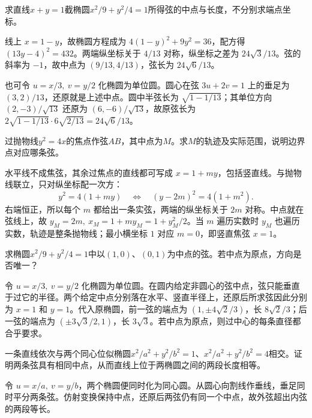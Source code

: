 求直线\(x+y=1\)截椭圆\(x^2/9+y^2/4=1\)所得弦的中点与长度，不分别求端点坐标。
\par
\solutionanswer
线上 \(x=1-y\)，故椭圆方程成为 \(4(1-y)^2+9y^2=36\)，配方得 \((13y-4)^2=432\)。两端纵坐标关于 \(4/13\) 对称，纵坐标之差为 \(24\sqrt3/13\)。弦的斜率为 \(-1\)，故中点为 \((9/13,4/13)\)，弦长为 \(24\sqrt6/13\)。

也可令 \(u=x/3,\ v=y/2\) 化椭圆为单位圆。圆心在弦 \(3u+2v=1\) 上的垂足为 \((3,2)/13\)，还原就是上述中点。圆中半弦长为 \(\sqrt{1-1/13}\)；其单位方向 \((2,-3)/\sqrt{13}\) 还原为 \((6,-6)/\sqrt{13}\)，故原弦长为 \(2\sqrt{1-1/13}\cdot6\sqrt{2/13}=24\sqrt6/13\)。




过抛物线\(y^2=4x\)的焦点作弦\(AB\)，其中点为\(M\)。求\(M\)的轨迹及实际范围，说明边界点对应哪条弦。
\par
\solutionanswer
水平线不成焦弦，其余过焦点的直线都可写成 \(x=1+my\)，包括竖直线。与抛物线联立，只对纵坐标配一次方：
\[
    y^2=4(1+my)\quad\Longleftrightarrow\quad (y-2m)^2=4(1+m^2).
\]
右端恒正，所以每个 \(m\) 都给出一条实弦，两端的纵坐标关于 \(2m\) 对称。中点就在弦线上，故 \(y_M=2m,\ x_M=1+my_M=1+y_M^2/2\)。当 \(m\) 遍历实数时 \(y_M\) 也遍历实数，轨迹是整条抛物线；最小横坐标 \(1\) 对应 \(m=0\)，即竖直焦弦 \(x=1\)。


求椭圆\(x^2/9+y^2/4=1\)中以\((1,0)\)、\((0,1)\)为中点的弦。若中点为原点，方向是否唯一？
\par
\solutionanswer
令 \(u=x/3,\ v=y/2\) 化椭圆为单位圆。在圆内给定非圆心的弦中点，弦只能垂直于过它的半径。两个给定中点分别落在水平、竖直半径上，还原后所求弦因此分别为 \(x=1\) 和 \(y=1\)。代入原椭圆，前一弦的端点为 \((1,\pm4\sqrt2/3)\)，长 \(8\sqrt2/3\)；后一弦的端点为 \((\pm3\sqrt3/2,1)\)，长 \(3\sqrt3\)。若中点为原点，则过中心的每条直径都合乎要求。




一条直线依次与两个同心位似椭圆\(x^2/a^2+y^2/b^2=1\)、\(x^2/a^2+y^2/b^2=4\)相交。证明两条弦具有相同中点，从而直线上位于两椭圆之间的两段长度相等。
\par
\solutionanswer
令 \(u=x/a,\ v=y/b\)，两个椭圆便同时化为同心圆。从圆心向割线作垂线，垂足同时平分两条弦。仿射变换保持中点，还原后两弦仍有同一个中点，故外弦超出内弦的两段等长。

